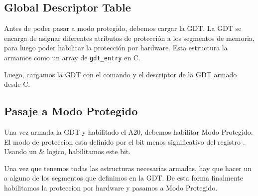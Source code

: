 \subsection{Global Descriptor Table}
Antes de poder pasar a modo protegido, debemos cargar la GDT. La GDT se encarga de asignar diferentes atributos de protección a los segmentos de memoria, para luego poder habilitar la protección por hardware. Esta estructura la armamos como un array de \texttt{gdt\_entry} en C.

Luego, cargamos la GDT con el comando  y el descriptor de la GDT armado desde C.

\subsection{Pasaje a Modo Protegido}
Una vez armada la GDT y habilitado el A20, debemos habilitar Modo Protegido. El modo de proteccion esta definido por el bit menos significativo del registro . Usando un \& logico, habilitamos este bit.

Una vez que tenemos todas las estructuras necesarias armadas, hay que hacer un  a alguno de los segmentos que definimos en la GDT. De esta forma finalmente habilitamos la proteccion por hardware y pasamos a Modo Protegido. 

